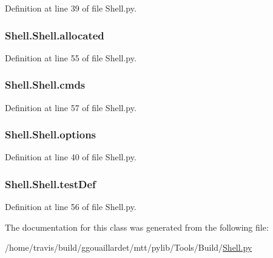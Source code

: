 Definition at line 39 of file Shell.\-py.

\hypertarget{classShell_1_1Shell_a7d3526fa682799bd7be51fa09c2c9017}{
\subsubsection[{allocated}]{\setlength{\rightskip}{0pt plus 5cm}Shell.\-Shell.\-allocated}}\label{classShell_1_1Shell_a7d3526fa682799bd7be51fa09c2c9017}


Definition at line 55 of file Shell.\-py.

\hypertarget{classShell_1_1Shell_abe2dca7284b995f29494ae5e2ea975a7}{
\subsubsection[{cmds}]{\setlength{\rightskip}{0pt plus 5cm}Shell.\-Shell.\-cmds}}\label{classShell_1_1Shell_abe2dca7284b995f29494ae5e2ea975a7}


Definition at line 57 of file Shell.\-py.

\hypertarget{classShell_1_1Shell_a3e2a9754ac3fa0e2a00c5f0861ef85f2}{
\subsubsection[{options}]{\setlength{\rightskip}{0pt plus 5cm}Shell.\-Shell.\-options}}\label{classShell_1_1Shell_a3e2a9754ac3fa0e2a00c5f0861ef85f2}


Definition at line 40 of file Shell.\-py.

\hypertarget{classShell_1_1Shell_ac2533422279cd3b3d3bc43e8b3de1301}{
\subsubsection[{test\-Def}]{\setlength{\rightskip}{0pt plus 5cm}Shell.\-Shell.\-test\-Def}}\label{classShell_1_1Shell_ac2533422279cd3b3d3bc43e8b3de1301}


Definition at line 56 of file Shell.\-py.



The documentation for this class was generated from the following file\-:\begin{DoxyCompactItemize}
\item 
/home/travis/build/ggouaillardet/mtt/pylib/\-Tools/\-Build/\hyperlink{Shell_8py}{Shell.\-py}\end{DoxyCompactItemize}
